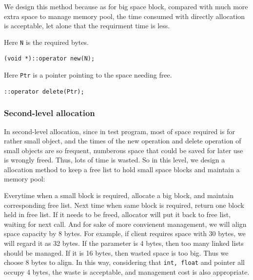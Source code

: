 \documentclass{article}
\begin{document}
We design this method because as for big space block, compared with much more extra space to manage memory pool, the time consumed with directly allocation is acceptable, let alone that the requirment time is less.

Here \texttt{N} is the required bytes.
\begin{lstlisting}
(void *)::operator new(N);
\end{lstlisting}

Here \texttt{Ptr} is a pointer pointing to the space needing free.
\begin{lstlisting}
::operator delete(Ptr);
\end{lstlisting}
\subsubsection{Second-level allocation}
In second-level allocation, since in test program, most of space required is for rather small object, and the times of the new operation and delete operation of small objects are so frequent, numberous space that could be saved for later use is wrongly freed. Thus, lots of time is wasted. So in this level, we design a allocation method to keep a free list to hold small space blocks and maintain a memory pool:

Everytime when a small block is required, allocate a big block, and maintain corresponding free list. Next time when same block is required, return one block held in free list. If it needs to be freed, allocator will put it back to free list, waiting for next call. And for sake of more convienent management, we will align space capacity by 8 bytes. For example, if client requires space with 30 bytes, we will regard it as 32 bytes.  If the parameter is 4 bytes, then too many linked lists should be managed. If it is 16 bytes, then wasted space is too big. Thus we choose 8 bytes to align. In this way, considering that \texttt{int, float} and pointer all occupy 4 bytes, the waste is acceptable, and management cost is also appropriate.
\end{document}
